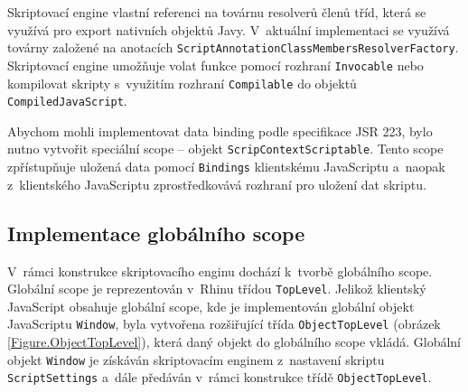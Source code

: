 Skriptovací engine vlastní referenci na továrnu resolverů členů tříd, která se využívá pro export nativních objektů Javy. V~aktuální implementaci se využívá továrny založené na anotacích \texttt{ScriptAnnotationClassMembersResolverFactory}. Skriptovací engine umožňuje volat funkce pomocí rozhraní \texttt{Invocable} nebo kompilovat skripty s~využitím rozhraní \texttt{Compilable} do objektů \texttt{CompiledJavaScript}.

Abychom mohli implementovat data binding podle specifikace JSR 223, bylo nutno vytvořit speciální scope -- objekt \texttt{ScripContextScriptable}. Tento scope zpřístupňuje uložená data pomocí \texttt{Bindings} klientskému JavaScriptu a~naopak z~klientského JavaScriptu zprostředkovává rozhraní pro uložení dat skriptu.

\subsection{Implementace globálního scope }
\label{Chapter.Implementation.GlobalScopeImplementation}

V~rámci konstrukce skriptovacího enginu dochází k~tvorbě globálního scope. Globální scope je reprezentován v~Rhinu třídou \texttt{TopLevel}. Jelikož klientský JavaScript obsahuje globální scope, kde je implementován globální objekt JavaScriptu \texttt{Window}, byla vytvořena rozšiřující třída \texttt{ObjectTopLevel} (obrázek \ref{Figure.ObjectTopLevel}), která daný objekt do globálního scope  vkládá. Globální objekt \texttt{Window} je získáván skriptovacím enginem z~nastavení skriptu \texttt{ScriptSettings} a~dále předáván v~rámci konstrukce třídě \texttt{ObjectTopLevel}.

\medskip

